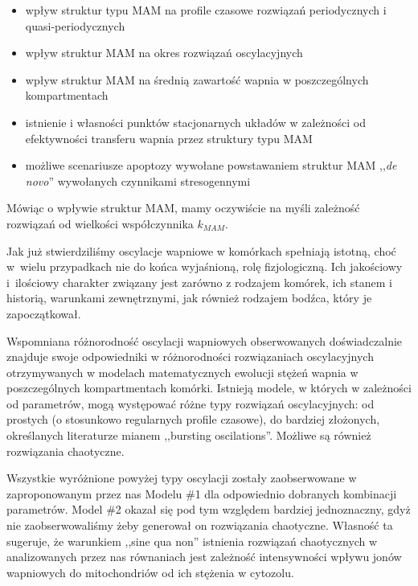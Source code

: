 \begin{itemize}
\item wpływ struktur typu MAM na profile czasowe rozwiązań periodycznych i quasi-periodycznych
\item wpływ struktur MAM na okres rozwiązań oscylacyjnych
\item wpływ struktur MAM na średnią zawartość wapnia w poszczególnych kompartmentach
\item istnienie i własności punktów stacjonarnych układów w zależności od efektywności transferu wapnia przez struktury typu MAM 
\item możliwe scenariusze apoptozy wywołane powstawaniem struktur MAM ,,\textit{de novo}'' wywołanych czynnikami stresogennymi
\end{itemize}
\smallskip 

\noindent Mówiąc o wpływie struktur MAM, mamy oczywiście na myśli zależność rozwiązań od wielkości współczynnika $k_{MAM}$. 

\medskip 

Jak już stwierdziliśmy oscylacje wapniowe w komórkach spełniają istotną, choć w~wielu przypadkach nie do końca wyjaśnioną, rolę fizjologiczną. Ich jakościowy i~ilościowy charakter związany jest zarówno z rodzajem komórek, ich stanem i historią, warunkami zewnętrznymi, jak również rodzajem bodźca, który je zapoczątkował. 

\medskip 

Wspomniana różnorodność oscylacji wapniowych obserwowanych doświadczalnie znajduje swoje odpowiedniki w różnorodności rozwiązaniach oscylacyjnych otrzymywanych w modelach matematycznych ewolucji stężeń wapnia w poszczególnych kompartmentach komórki. Istnieją modele, w których w zależności od parametrów, mogą występować różne typy rozwiązań oscylacyjnych: od prostych  (o stosunkowo regularnych profile czasowe), do bardziej złożonych, określanych literaturze mianem ,,bursting oscilations''. Możliwe są również rozwiązania chaotyczne. 

\medskip 

Wszystkie wyróżnione powyżej typy oscylacji zostały zaobserwowane w zaproponowanym przez nas Modelu \#1 dla odpowiednio dobranych kombinacji parametrów. Model \#2 okazał się pod tym względem bardziej jednoznaczny, gdyż nie zaobserwowaliśmy żeby generował on rozwiązania chaotyczne. Własność ta sugeruje, że warunkiem ,,sine qua non'' istnienia rozwiązań chaotycznych w analizowanych przez nas równaniach jest zależność intensywności wpływu jonów wapniowych do mitochondriów od ich stężenia w cytozolu. 

